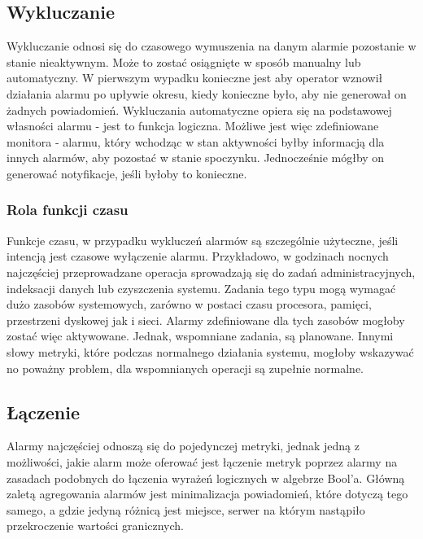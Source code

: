     \subsection{Wykluczanie}
    
        Wykluczanie odnosi się do czasowego wymuszenia na danym alarmie pozostanie w stanie nieaktywnym.
        Może to zostać osiągnięte w sposób manualny lub automatyczny. W pierwszym wypadku konieczne jest
        aby operator wznowił działania alarmu po upływie okresu, kiedy konieczne było, aby nie
        generował on żadnych powiadomień. Wykluczania automatyczne opiera się na podstawowej własności
        alarmu - jest to funkcja logiczna. Możliwe jest więc zdefiniowane monitora - alarmu, który wchodząc
        w stan aktywności byłby informacją dla innych alarmów, aby pozostać w stanie spoczynku. Jednocześnie
        mógłby on generować notyfikacje, jeśli byłoby to konieczne.
    
        \subsubsection{Rola funkcji czasu}
        Funkcje czasu, w przypadku wykluczeń alarmów są szczególnie użyteczne, jeśli intencją jest czasowe wyłączenie
        alarmu. Przykładowo, w godzinach nocnych najczęściej przeprowadzane operacja sprowadzają się do zadań 
        administracyjnych, indeksacji danych lub czyszczenia systemu. Zadania tego typu mogą wymagać dużo
        zasobów systemowych, zarówno w postaci czasu procesora, pamięci, przestrzeni dyskowej jak i sieci.
        Alarmy zdefiniowane dla tych zasobów mogłoby zostać więc aktywowane. Jednak, wspomniane zadania, 
        są planowane. Innymi słowy metryki, które podczas normalnego działania systemu, mogłoby wskazywać
        no poważny problem, dla wspomnianych operacji są zupełnie normalne. 
    
    \subsection{Łączenie}
    \label{chapter:monitoring:anatomy_of_alarm:assocation}
    
        Alarmy najczęściej odnoszą się do pojedynczej metryki, jednak jedną z możliwości, jakie alarm może
        oferować jest łączenie metryk poprzez alarmy na zasadach podobnych do łączenia wyrażeń
        logicznych w algebrze Bool'a. Główną zaletą agregowania alarmów jest minimalizacja powiadomień, 
        które dotyczą tego samego, a gdzie jedyną różnicą jest miejsce, serwer na którym nastąpiło
        przekroczenie wartości granicznych. 
    
